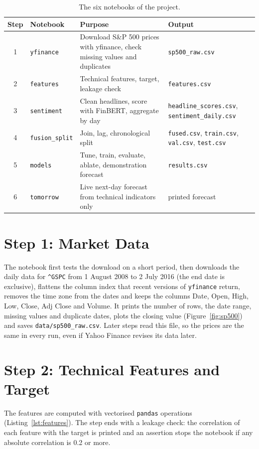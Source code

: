 \begin{table}[!htbp]
\centering
\small
\begin{tabularx}{\textwidth}{@{}c p{3.4cm} X p{4.3cm}@{}}
\toprule
Step & Notebook & Purpose & Output \\
\midrule
1 & \texttt{yfinance} & Download S\&P 500 prices with yfinance, check missing values and duplicates & \texttt{sp500\_raw.csv} \\
2 & \texttt{features} & Technical features, target, leakage check & \texttt{features.csv} \\
3 & \texttt{sentiment} & Clean headlines, score with FinBERT, aggregate by day & \texttt{headline\_scores.csv}, \texttt{sentiment\_daily.csv} \\
4 & \texttt{fusion\_split} & Join, lag, chronological split & \texttt{fused.csv}, \texttt{train.csv}, \texttt{val.csv}, \texttt{test.csv} \\
5 & \texttt{models} & Tune, train, evaluate, ablate, demonstration forecast & \texttt{results.csv} \\
6 & \texttt{tomorrow} & Live next-day forecast from technical indicators only & printed forecast \\
\bottomrule
\end{tabularx}
\caption{The six notebooks of the project.}
\label{tab:notebooks}
\end{table}

\section{Step 1: Market Data}
The notebook first tests the download on a short period, then downloads the daily data for \texttt{\textasciicircum GSPC} from 1 August 2008 to 2 July 2016 (the end date is exclusive), flattens the column index that recent versions of \texttt{yfinance} return, removes the time zone from the dates and keeps the columns Date, Open, High, Low, Close, Adj Close and Volume. It prints the number of rows, the date range, missing values and duplicate dates, plots the closing value (Figure~\ref{fig:sp500}) and saves \texttt{data/sp500\_raw.csv}. Later steps read this file, so the prices are the same in every run, even if Yahoo Finance revises its data later.

\section{Step 2: Technical Features and Target}
The features are computed with vectorised \texttt{pandas} operations (Listing~\ref{lst:features}). The step ends with a leakage check: the correlation of each feature with the target is printed and an assertion stops the notebook if any absolute correlation is 0.2 or more.

